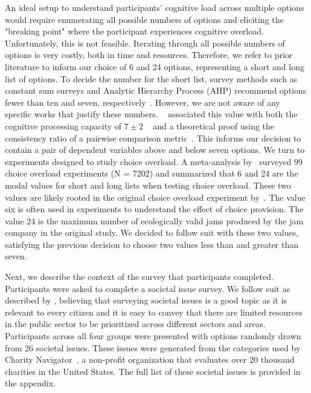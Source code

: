 An ideal setup to understand participants' cognitive load across multiple options would require enumerating all possible numbers of options and eliciting the "breaking point" where the participant experiences cognitive overload. Unfortunately, this is not feasible. Iterating through all possible numbers of options is very costly, both in time and resources. Therefore, we refer to prior literature to inform our choice of 6 and 24 options, representing a short and long list of options. To decide the number for the short list, survey methods such as constant sum surveys and Analytic Hierarchy Process (AHP) recommend options fewer than ten and seven, respectively~\cite{moroneyQuestionnaireDesignHow2019, saatyGroupDecisionMaking2013, saatyPrinciplesAnalyticHierarchy1987}. However, we are not aware of any specific works that justify these numbers. ~\textcite{saatyPrinciplesAnalyticHierarchy1987} associated this value with both the cognitive processing capacity of $7\pm2$ ~\cite{miller1956magical} and a theoretical proof using the consistency ratio of a pairwise comparison metric~\cite{saaty2003magic}. This informs our decision to contain a pair of dependent variables above and below seven options. We turn to experiments designed to study choice overload. A meta-analysis by~\textcite{chernev2015choice} surveyed 99 choice overload experiments (N = 7202) and summarized that 6 and 24 are the modal values for short and long lists when testing choice overload. These two values are likely rooted in the original choice overload experiment by~\textcite{iyengarWhenChoiceDemotivating2000}. The value six is often used in experiments to understand the effect of choice provision. The value 24 is the maximum number of ecologically valid jams produced by the jam company in the original study. We decided to follow suit with these two values, satisfying the previous decision to choose two values less than and greater than seven.

Next, we describe the context of the survey that participants completed. Participants were asked to complete a societal issue survey. We follow suit as described by \textcite{chengCanShowWhat2021}, believing that surveying societal issues is a good topic as it is relevant to every citizen and it is easy to convey that there are limited resources in the public sector to be prioritized across different sectors and areas. Participants across all four groups were presented with options randomly drawn from 26 societal issues. These issues were generated from the categories used by Charity Navigator~\cite{CharityNavigatorAnimals2023}, a non-profit organization that evaluates over 20 thousand charities in the United States. The full list of these societal issues is provided in the appendix.


